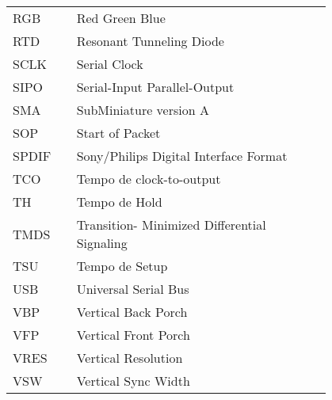 \begin{flushleft}
\begin{longtable}{l p{0.8\linewidth}}
RGB       & Red Green Blue                                                                               \\
RTD       & Resonant Tunneling Diode                                                                     \\
SCLK      & Serial Clock                                                                                 \\
SIPO      & Serial-Input Parallel-Output                                                                 \\
SMA       & SubMiniature version A                                                                       \\
SOP       & Start of Packet                                                                              \\
SPDIF     & Sony/Philips Digital Interface Format                                                        \\
TCO       & Tempo de clock-to-output                                                                     \\
TH        & Tempo de Hold                                                                                \\
TMDS      & Transition- Minimized Differential Signaling                                                 \\
TSU       & Tempo de Setup                                                                               \\
USB       & Universal Serial Bus                                                                         \\
VBP       & Vertical Back Porch                                                                          \\
VFP       & Vertical Front Porch                                                                         \\
VRES      & Vertical Resolution                                                                          \\
VSW       & Vertical Sync Width                                                                         
\end{longtable}
\end{flushleft}

